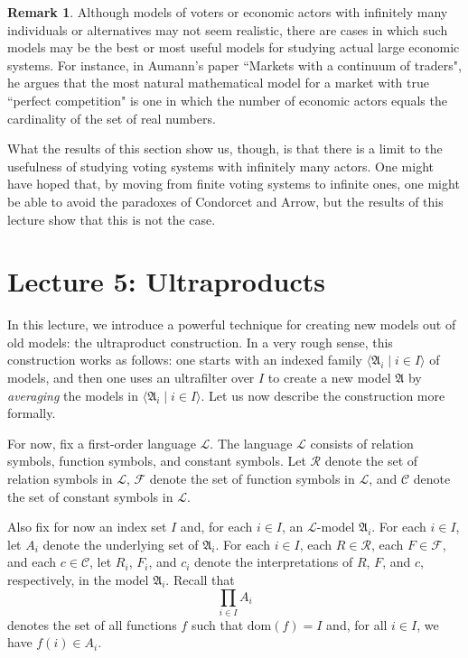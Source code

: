 \documentclass[a4paper]{memoir}
\theoremstyle{definition}
\newtheorem{remark}[theorem]{Remark}
\newcommand{\dom}{\mathrm{dom}}
\newcommand{\mc}{\mathcal}
\begin{document}
\begin{remark}
  Although models of voters or economic actors with infinitely many individuals or alternatives may 
  not seem realistic, there are cases in which such models may be the best or most useful 
  models for studying actual large economic systems. For instance, in Aumann's paper ``Markets 
  with a continuum of traders", he argues that the most natural mathematical model for a market with 
  true ``perfect competition" is one in which the number of economic actors equals the cardinality 
  of the set of real numbers.
  
  What the results of this section show us, though, is that there is a limit to the usefulness of 
  studying voting systems with infinitely many actors. One might have hoped that, by moving from 
  finite voting systems to infinite ones, one might be able to avoid the paradoxes of Condorcet 
  and Arrow, but the results of this lecture show that this is not the case.
\end{remark}

\chapter{Lecture 5: Ultraproducts}

In this lecture, we introduce a powerful technique for creating new models out of old models: 
the ultraproduct construction. In a very rough sense, this construction works as follows: one 
starts with an indexed family $\langle \mathfrak{A}_i \mid i \in I \rangle$ of models, and then one uses 
an ultrafilter over $I$ to create a new model $\mathfrak{A}$ by \emph{averaging} the models in 
$\langle \mathfrak{A}_i \mid i \in I \rangle$. Let us now describe the construction more formally.

For now, fix a first-order language $\mc{L}$. The language $\mc{L}$ consists of relation 
symbols, function symbols, and constant symbols. Let $\mc{R}$ denote the set of relation 
symbols in $\mc{L}$, $\mc{F}$ denote the set of function symbols in $\mc{L}$, and 
$\mc{C}$ denote the set of constant symbols in $\mc{L}$. 

Also fix for now an index set $I$ and, for each $i \in I$, an $\mc{L}$-model $\mathfrak{A}_i$.
For each $i \in I$, let $A_i$ denote the underlying set of $\mathfrak{A}_i$. 
For each $i \in I$, each $R \in \mc{R}$, each $F \in \mc{F}$, and each $c \in \mc{C}$, 
let $R_i$, $F_i$, and $c_i$ denote the interpretations of $R$, $F$, and $c$, respectively, 
in the model $\mathfrak{A}_i$. Recall that 
\[
  \prod_{i \in I} A_i
\]
denotes the set of all functions $f$ such that $\dom(f) = I$ and, for all $i \in I$, we have 
$f(i) \in A_i$.
\end{document}
